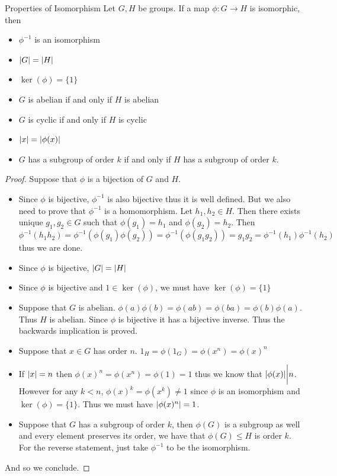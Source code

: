 \documentclass[a4paper]{article}
\begin{document}
\begin{prp}{Properties of Isomorphism}{} Let $G,H$ be groups. If a map $\phi:G\to H$ is isomorphic, then
\begin{itemize}
\item $\phi^{-1}$ is an isomorphism
\item $\abs{G}=\abs{H}$
\item $\ker(\phi)=\{1\}$
\item $G$ is abelian if and only if $H$ is abelian
\item $G$ is cyclic if and only if $H$ is cyclic
\item $\abs{x}=\abs{\phi(x)}$
\item $G$ has a subgroup of order $k$ if and only if $H$ has a subgroup of order $k$. 
\end{itemize}\tcbline
\begin{proof} Suppose that $\phi$ is a bijection of $G$ and $H$. 
\begin{itemize}
\item Since $\phi$ is bijective, $\phi^{-1}$ is also bijective thus it is well defined. But we also need to prove that $\phi^{-1}$ is a homomorphism. Let $h_1,h_2\in H$. Then there exists unique $g_1,g_2\in G$ such that $\phi(g_1)=h_1$ and $\phi(g_2)=h_2$. Then $$\phi^{-1}(h_1h_2)=\phi^{-1}(\phi(g_1)\phi(g_2))=\phi^{-1}(\phi(g_1g_2))=g_1g_2=\phi^{-1}(h_1)\phi^{-1}(h_2)$$ thus we are done. 
\item Since $\phi$ is bijective, $\abs{G}=\abs{H}$
\item Since $\phi$ is bijective and $1\in\ker(\phi)$, we must have $\ker(\phi)=\{1\}$
\item Suppose that $G$ is abelian. $\phi(a)\phi(b)=\phi(ab)=\phi(ba)=\phi(b)\phi(a)$. Thus $H$ is abelian. Since $\phi$ is bijective it has a bijective inverse. Thus the backwards implication is proved. 
\item Suppose that $x\in G$ has order $n$. $1_H=\phi(1_G)=\phi(x^n)=\phi(x)^n$
\item If $\abs{x}=n$ then $\phi(x)^n=\phi(x^n)=\phi(1)=1$ thus we know that $\abs{\phi(x)}\bigg{|}n$. However for any $k<n$, $\phi(x)^k=\phi(x^k)\neq 1$ since $\phi$ is an isomorphism and $\ker(\phi)=\{1\}$. Thus we must have $\abs{\phi(x)^n}=1$. 
\item Suppose that $G$ has a subgroup of order $k$, then $\phi(G)$ is a subgroup as well and every element preserves its order, we have that $\phi(G)\leq H$ is order $k$. For the reverse statement, just take $\phi^{-1}$ to be the isomorphism. 
\end{itemize}
And so we conclude. 
\end{proof}
\end{prp}
\end{document}
